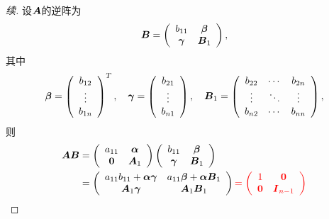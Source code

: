 \begin{proof}[续]
设$\boldsymbol{A}$的逆阵为
$$
\begin{aligned}
\boldsymbol{B} = \left(
  \begin{array}{cc}
    b_{11} & \boldsymbol{\beta}\\
    \boldsymbol{\gamma} & \boldsymbol{B}_1 
  \end{array}    
\right),  
\end{aligned}
$$
其中
$$
\begin{aligned}
 \boldsymbol{\beta} = \left(
  \begin{array}{c}
    b_{12}\\
    \vdots \\
    b_{1n}
  \end{array}
\right)^T,  
\quad \boldsymbol{\gamma} = \left(
  \begin{array}{c}
    b_{21}\\
    \vdots \\
    b_{n1}
  \end{array}
\right), \quad
\boldsymbol{B}_1 = \left(
  \begin{array}{ccc}
    b_{22} & \cdots & b_{2n}\\
    \vdots   & \ddots & \vdots \\
    b_{n2} & \cdots & b_{nn}
  \end{array}
\right),
\end{aligned}
$$
则
$$
\begin{aligned}
\MA\MB &= \left(
  \begin{array}{cc}
    a_{11} & \alphabd \\
    \M0 & \MA_1
  \end{array}
\right)\left(
  \begin{array}{cc}
    b_{11} & \betabd \\
    \gammabd & \MB_1
  \end{array}
\right) \\
& = \left(
  \begin{array}{cc}
    a_{11}b_{11}+\alphabd\gammabd & a_{11}\betabd+\alphabd \MB_1\\
    \MA_1\gammabd & \MA_1\MB_1
  \end{array}
\right)  \red{
= \left(
  \begin{array}{cc}
    1 & \M0 \\
    \M0 & \MI_{n-1}
  \end{array}
\right)
}
\end{aligned}
  $$
\end{proof}



